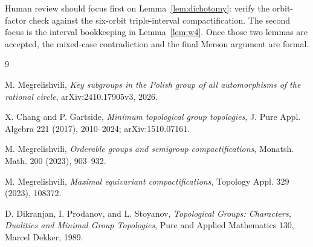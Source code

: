 \documentclass[11pt]{article}
\begin{document}
Human review should focus first on Lemma~\ref{lem:dichotomy}: verify the
orbit-factor check against the six-orbit triple-interval compactification.
The second focus is the interval bookkeeping in Lemma~\ref{lem:w4}.  Once
those two lemmas are accepted, the mixed-case contradiction and the final
Merson argument are formal.

\begin{thebibliography}{9}

M. Megrelishvili,
\emph{Key subgroups in the Polish group of all automorphisms of the rational circle},
arXiv:2410.17905v3, 2026.

X. Chang and P. Gartside,
\emph{Minimum topological group topologies},
J. Pure Appl. Algebra 221 (2017), 2010--2024;
arXiv:1510.07161.

M. Megrelishvili,
\emph{Orderable groups and semigroup compactifications},
Monatsh. Math. 200 (2023), 903--932.

M. Megrelishvili,
\emph{Maximal equivariant compactifications},
Topology Appl. 329 (2023), 108372.

D. Dikranjan, I. Prodanov, and L. Stoyanov,
\emph{Topological Groups: Characters, Dualities and Minimal Group Topologies},
Pure and Applied Mathematics 130, Marcel Dekker, 1989.

\end{thebibliography}
\end{document}
